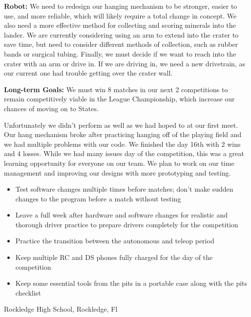 {	\bigskip

	\textbf{Robot:} We need to redesign our hanging mechanism to be stronger, easier to use, and more reliable, which will likely require a total change in concept. We also need a more effective method for collecting and scoring minerals into the lander. We are currently considering using an arm to extend into the crater to save time, but need to consider different methods of collection, such as rubber bands or surgical tubing. Finally, we must decide if we want to reach into the crater with an arm or drive in. If we are driving in, we need a new drivetrain, as our current one had trouble getting over the crater wall.

	\bigskip

	\textbf{Long-term Goals:} We must win 8 matches in our next 2 competitions to remain competitively viable in the League Championship, which increase our chances of moving on to States.

	\bigskip

	Unfortunately we didn’t perform as well as we had hoped to at our first meet. Our hang mechanism broke after practicing hanging off of the playing field and we had multiple problems with our code. We finished the day 16th with 2 wins and 4 losses. While we had many issues day of the competition, this was a great learning opportunity for everyone on our team. We plan to work on our time management and improving our designs with more prototyping and testing.
}
{
  \begin{itemize}
      \item Test software changes multiple times before matches; don't make sudden changes to the program before a match without testing
      \item Leave a full week after hardware and software changes for realistic and thorough driver practice to prepare drivers completely for the competition
      \item Practice the transition between the autonomous and teleop period 
      \item Keep multiple RC and DS phones fully charged for the day of the competition
      \item Keep some essential tools from the pits in a portable case along with the pits checklist 
  \end{itemize} 
}
{Rockledge High School, Rockledge, Fl}
